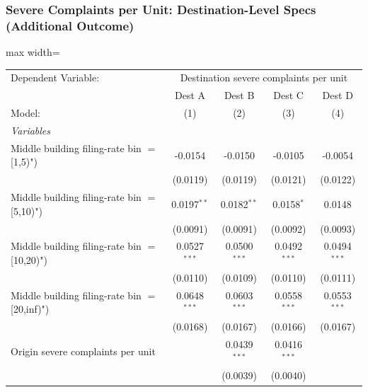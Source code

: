 \documentclass[
  11pt,
]{article}
\begin{document}
\subsubsection{Severe Complaints per Unit: Destination-Level Specs
(Additional
Outcome)}\label{severe-complaints-per-unit-destination-level-specs-additional-outcome}

\begin{adjustbox}{max width=\textwidth}
\begingroup
\centering
\begin{tabular}{lcccc}
   \tabularnewline \midrule \midrule
   Dependent Variable: & \multicolumn{4}{c}{Destination severe complaints per unit}\\
                                                  & Dest A         & Dest B         & Dest C         & Dest D \\   
   Model:                                         & (1)            & (2)            & (3)            & (4)\\  
   \midrule
   \emph{Variables}\\
   Middle building filing-rate bin $=$ [1,5)")    & -0.0154        & -0.0150        & -0.0105        & -0.0054\\   
                                                  & (0.0119)       & (0.0119)       & (0.0121)       & (0.0122)\\   
   Middle building filing-rate bin $=$ [5,10)")   & 0.0197$^{**}$  & 0.0182$^{**}$  & 0.0158$^{*}$   & 0.0148\\   
                                                  & (0.0091)       & (0.0091)       & (0.0092)       & (0.0093)\\   
   Middle building filing-rate bin $=$ [10,20)")  & 0.0527$^{***}$ & 0.0500$^{***}$ & 0.0492$^{***}$ & 0.0494$^{***}$\\   
                                                  & (0.0110)       & (0.0109)       & (0.0110)       & (0.0111)\\   
   Middle building filing-rate bin $=$ [20,inf)") & 0.0648$^{***}$ & 0.0603$^{***}$ & 0.0558$^{***}$ & 0.0553$^{***}$\\   
                                                  & (0.0168)       & (0.0167)       & (0.0166)       & (0.0167)\\   
   Origin severe complaints per unit              &                & 0.0439$^{***}$ & 0.0416$^{***}$ &   \\   
                                                  &                & (0.0039)       & (0.0040)       &   \\   

\end{tabular}
\end{adjustbox}
\end{document}
